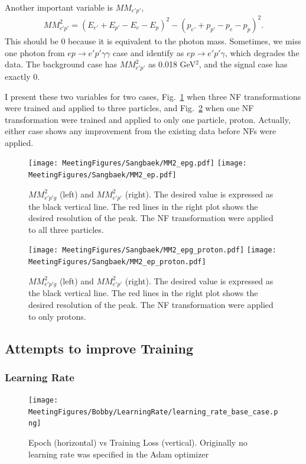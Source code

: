 Another important variable is $MM_{e'p'}$, 
\begin{align}
    MM_{e'p'}^2 = (E_{e'}+E_{p'} - E_e - E_p)^2 - (p_{e'}+p_{p'} - p_e - p_p)^2.
\end{align}
This should be 0 because it is equivalent to the photon mass. Sometimes, we miss one photon from $ep\rightarrow e'p'\gamma\gamma$ case and identify as $ep\rightarrow e'p'\gamma$, which degrades the data. The background case has $MM_{e'p'}^2$ as 0.018 GeV$^2$, and the signal case has exactly 0.

I present these two variables for two cases, Fig.~\ref{fig:allparticleNF} when three NF transformations were trained and applied to three particles, and Fig.~\ref{fig:protonNF} when one NF transformation were trained and applied to only one particle, proton. Actually, either case shows any improvement from the existing data before NFs were applied.


\begin{figure}[!ht]
    \centering
    \texttt{[image: MeetingFigures/Sangbaek/MM2\_epg.pdf]}
    \texttt{[image: MeetingFigures/Sangbaek/MM2\_ep.pdf]}
    \caption{$MM_{e'p'g}^2$ (left) and $MM_{e'p'}^2$ (right). The desired value is expressed as the black vertical line. The red lines in the right plot shows the desired resolution of the peak. The NF transformation were applied to all three particles.}
    \label{fig:allparticleNF}
\end{figure}

\begin{figure}[!ht]
    \centering
    \texttt{[image: MeetingFigures/Sangbaek/MM2\_epg\_proton.pdf]}
    \texttt{[image: MeetingFigures/Sangbaek/MM2\_ep\_proton.pdf]}
    \caption{$MM_{e'p'g}^2$ (left) and $MM_{e'p'}^2$ (right). The desired value is expressed as the black vertical line. The red lines in the right plot shows the desired resolution of the peak. The NF transformation were applied to only protons.}
    \label{fig:protonNF}
\end{figure}
\clearpage
\subsection{Attempts to improve Training }

\subsubsection{Learning Rate}

\begin{figure}[!ht]
\centering
\texttt{[image: MeetingFigures/Bobby/LearningRate/learning\_rate\_base\_case.png]}
\label{fig: jul8_pion_comparison}
\caption{Epoch (horizontal) vs Training Loss (vertical). Originally no learning rate was specified in the Adam optimizer }
\end{figure}



